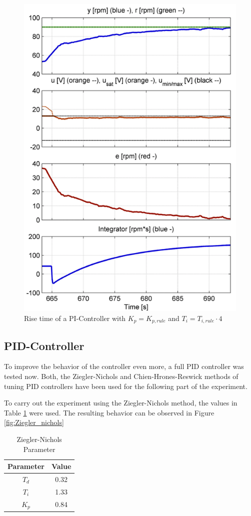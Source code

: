 \begin{figure}[H]
\begin{center}
\includegraphics[width=0.5\linewidth]{images/general/PI/PI_RiseTime4}
\end{center}
\caption{Rise time of a PI-Controller with $K_{p}= K_{p,rule}$ and $T_{i}=T_{i,rule}\cdot4$}
\label{fig:PI_RiseTime4}
\end{figure}

\clearpage
\subsection{PID-Controller}

To improve the behavior of the controller even more, a full PID controller was tested now.
Both, the Ziegler-Nichols and Chien-Hrones-Reswick methods of tuning PID controllers have been used for the following part of the experiment.

To carry out the experiment using the Ziegler-Nichols method, the values in Table \ref{tab:zn_params} were used.
The resulting behavior can be observed in Figure \ref{fig:Ziegler_nichols}

\begin{table}[H]
\begin{center}
\begin{tabular}{ |c|c| }
 \hline
 Parameter & Value\\
 \hline
 $T_{d}$ & 0.32\\
 \hline
 $T_{i}$ & 1.33\\
 \hline
 $K_{p}$ & 0.84\\
 \hline
\end{tabular}
\end{center}
\caption{Ziegler-Nichols Parameter}
\label{tab:zn_params}
\end{table}

